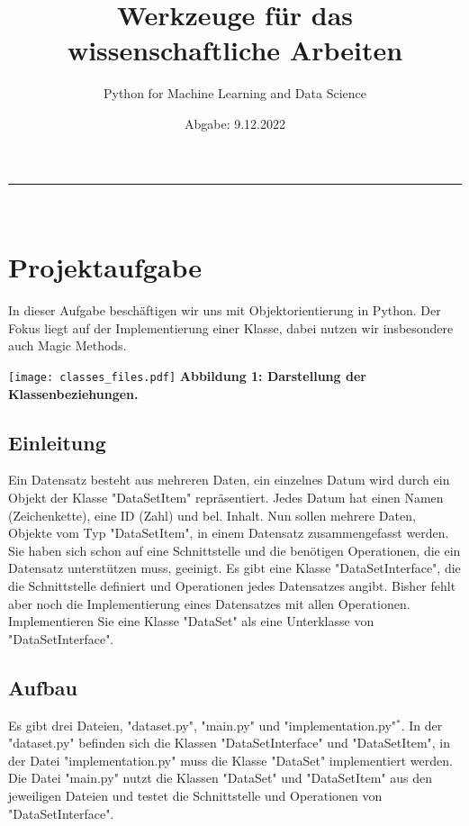 \documentclass[]{article}
\title{Werkzeuge für das wissenschaftliche Arbeiten}
\date{Abgabe: 9.12.2022}
\author{Python for Machine Learning and Data Science}
\begin{document}
\maketitle

\hrule\hfill\\[0.2cm]
\renewcommand{\contentsname}{Inhaltsverzeichnis}
\tableofcontents
\newpage

\section{Projektaufgabe}
In dieser Aufgabe beschäftigen wir uns mit Objektorientierung in Python.
Der Fokus liegt auf der Implementierung einer Klasse, dabei nutzen wir insbesondere auch Magic Methods.
\newline

\texttt{[image: classes\_files.pdf]}
\newline
\scriptsize\bf Abbildung 1: \normalfont Darstellung der Klassenbeziehungen. \normalsize
\newline

\subsection{Einleitung}
Ein Datensatz besteht aus mehreren Daten, ein einzelnes Datum wird durch ein Objekt der Klasse "DataSetItem" repräsentiert.
Jedes Datum hat einen Namen (Zeichenkette), eine ID (Zahl) und bel. Inhalt.
\newline
\newline
Nun sollen mehrere Daten, Objekte vom Typ "DataSetItem", in einem Datensatz zusammengefasst werden.
Sie haben sich schon auf eine Schnittstelle und die benötigen Operationen, die ein Datensatz unterstützen muss, geeinigt.
Es gibt eine Klasse "DataSetInterface", die die Schnittstelle definiert und Operationen jedes Datensatzes angibt.
Bisher fehlt aber noch die Implementierung eines Datensatzes mit allen Operationen.
\newline
\newline
Implementieren Sie eine Klasse "DataSet" als eine Unterklasse von "DataSetInterface".
\newline
\newline

\subsection{Aufbau}
Es gibt drei Dateien, "dataset.py", "main.py" und "implementation.py"$^*$.
In der "dataset.py" befinden sich die Klassen "DataSetInterface" und "DataSetItem", in der Datei "implementation.py" muss die Klasse "DataSet" implementiert werden. Die Datei "main.py" nutzt die Klassen "DataSet" und "DataSetItem" aus den jeweiligen Dateien und testet die Schnittstelle und Operationen von "DataSetInterface".
\newline
\newline
\end{document}
